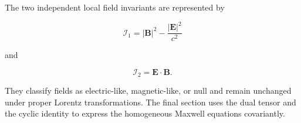 The two independent local field invariants are represented by

\[
\mathcal{I}_1
=
|\mathbf{B}|^2
-
\frac{|\mathbf{E}|^2}{c^2}
\]

and

\[
\mathcal{I}_2
=
\mathbf{E}\cdot\mathbf{B}.
\]

They classify fields as electric-like, magnetic-like, or null and remain unchanged under proper Lorentz transformations. The final section uses the dual tensor and the cyclic identity to express the homogeneous Maxwell equations covariantly.
